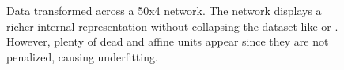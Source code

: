 \begin{figure}
{{    }
  }
  \caption{Data transformed across a 50x4 \SepPoint network. The network displays a richer internal representation without collapsing the dataset like \SepUnit or \ReLUBN. However, plenty of dead and affine units appear since they are not penalized, causing underfitting.}
    \label{fig:moonsPointwise}
\end{figure}


\begin{figure}
  \centering
   \parbox{\textwidth}{
    \parbox{.195\textwidth}{%
    }
    \parbox{.195\textwidth}{%
}}
\end{figure}
